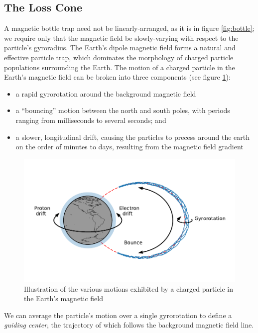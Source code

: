 \subsection{The Loss Cone}

A magnetic bottle trap need not be linearly-arranged, as it is in figure \ref{fig:bottle}; we require only that the magnetic field be slowly-varying with respect to the particle's gyroradius. The Earth's dipole magnetic field forms a natural and effective particle trap, which dominates the morphology of charged particle populations surrounding the Earth. The motion of a charged particle in the Earth's magnetic field can be broken into three components (see figure \ref{fig:adiabatic_motions}): 
\begin{itemize}
\item a rapid gyrorotation around the background magnetic field
\item a ``bouncing'' motion between the north and south poles, with periods ranging from milliseconds to several seconds; and
\item a slower, longitudinal drift, causing the particles to precess around the earth on the order of minutes to days, resulting from the magnetic field gradient
\end{itemize}

\begin{figure}[t]
\begin{center}
\includegraphics{figures/particle_motions.pdf}
\caption[Adiabatic motion in the Earth's magnetic field]{Illustration of the various motions exhibited by a charged particle in the Earth's magnetic field}
\label{fig:adiabatic_motions}
\end{center}
\end{figure}

\noindent We can average the particle's motion over a single gyrorotation to define a \emph{guiding center}, the trajectory of which follows the background magnetic field line. 

